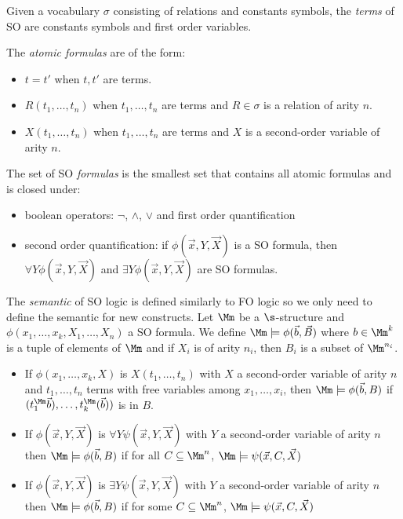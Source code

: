 \begin{definition}
    Given a vocabulary $\sigma$ consisting of relations
    and constants symbols,
    the \emph{terms} of SO are constants symbols and first order variables.

    The \emph{atomic formulas} are of the form:
    \begin{itemize}
        \item $t = t'$ when $t, t'$ are terms.
        \item $R(t_1, \dots, t_n)$ when $t_1, \dots, t_n$ are terms
            and $R \in \sigma$ is a relation of arity $n$.
        \item $X(t_1, \dots, t_n)$ when $t_1, \dots, t_n$ are terms
            and $X$ is a second-order variable of arity $n$.
    \end{itemize}

    The set of SO \emph{formulas} is the smallest set that contains
    all atomic formulas and is closed under:
    \begin{itemize}
        \item boolean operators: $\neg$, $\wedge$, $\vee$ and first order quantification
        \item second order quantification: if $\phi(\vec{x}, Y, \vec{X})$
            is a SO formula, then $\forall Y \phi(\vec{x}, Y, \vec{X})$
            and $\exists Y \phi(\vec{x}, Y, \vec{X})$ are SO formulas.
    \end{itemize}

    The \emph{semantic} of SO logic is defined similarly to FO logic
    so we only need to define the semantic for new constructs.
    Let $\Mm$ be a $\s$-structure and $\phi(x_1, \dots, x_k, X_1, \dots, X_n)$
    a SO formula. We define $\Mm \models \phi(\vec{b}, \vec{B})$
    where $b \in \Mm^k$ is a tuple of elements of $\Mm$
    and if $X_i$ is of arity $n_i$, then $B_i$ is a subset of $\Mm^{n_i}$.

    \begin{itemize}
        \item If $\phi(x_1, \dots, x_k, X)$ is $X(t_1, \dots, t_n)$
            with $X$ a second-order variable of arity $n$
            and $t_1, \dots, t_n$ terms with free variables
            among $x_1, \dots, x_i$, then
            $\Mm \models \phi(\vec{b}, B)$
            if $(t_1^\Mm\vec{b}), \dots, t_k^\Mm(\vec{b}))$ is in $B$.
        \item If $\phi(\vec{x}, Y, \vec{X})$ is $\forall Y \psi(\vec{x}, Y, \vec{X})$
            with $Y$ a second-order variable of arity $n$
            then $\Mm \models \phi(\vec{b}, B)$
            if for all $C \subseteq \Mm^n$, $\Mm \models \psi(\vec{x}, C, \vec{X})$
        \item If $\phi(\vec{x}, Y, \vec{X})$ is $\exists Y \psi(\vec{x}, Y, \vec{X})$
            with $Y$ a second-order variable of arity $n$
            then $\Mm \models \phi(\vec{b}, B)$
            if for some $C \subseteq \Mm^n$, $\Mm \models \psi(\vec{x}, C, \vec{X})$
    \end{itemize}
\end{definition}

